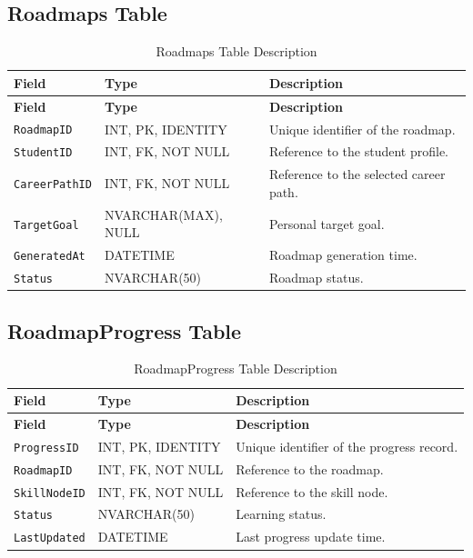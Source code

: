 \subsection{Roadmaps Table}

\begin{longtable}{|>{\raggedright\arraybackslash}m{2.9cm}|>{\raggedright\arraybackslash}m{3.45cm}|>{\raggedright\arraybackslash}m{4.95cm}|}
\caption{Roadmaps Table Description}
\label{tab:roadmaps_table_description}
\\
\hline
\textbf{Field} & \textbf{Type} & \textbf{Description} \\
\hline
\endfirsthead
\hline
\textbf{Field} & \textbf{Type} & \textbf{Description} \\
\hline
\endhead
\texttt{RoadmapID} & INT, PK, IDENTITY & Unique identifier of the roadmap. \\
\hline
\texttt{StudentID} & INT, FK, NOT NULL & Reference to the student profile. \\
\hline
\texttt{CareerPathID} & INT, FK, NOT NULL & Reference to the selected career path. \\
\hline
\texttt{TargetGoal} & NVARCHAR(MAX), NULL & Personal target goal. \\
\hline
\texttt{GeneratedAt} & DATETIME & Roadmap generation time. \\
\hline
\texttt{Status} & NVARCHAR(50) & Roadmap status. \\
\hline
\end{longtable}

\subsection{RoadmapProgress Table}

\begin{longtable}{|>{\raggedright\arraybackslash}m{2.9cm}|>{\raggedright\arraybackslash}m{3.45cm}|>{\raggedright\arraybackslash}m{4.95cm}|}
\caption{RoadmapProgress Table Description}
\label{tab:roadmap_progress_table_description}
\\
\hline
\textbf{Field} & \textbf{Type} & \textbf{Description} \\
\hline
\endfirsthead
\hline
\textbf{Field} & \textbf{Type} & \textbf{Description} \\
\hline
\endhead
\texttt{ProgressID} & INT, PK, IDENTITY & Unique identifier of the progress record. \\
\hline
\texttt{RoadmapID} & INT, FK, NOT NULL & Reference to the roadmap. \\
\hline
\texttt{SkillNodeID} & INT, FK, NOT NULL & Reference to the skill node. \\
\hline
\texttt{Status} & NVARCHAR(50) & Learning status. \\
\hline
\texttt{LastUpdated} & DATETIME & Last progress update time. \\
\hline
\end{longtable}

